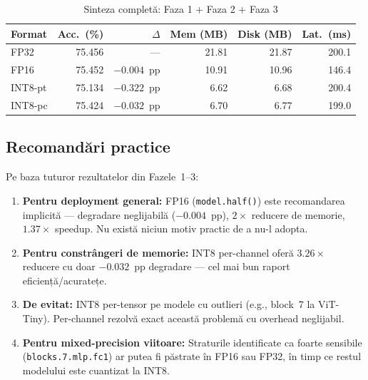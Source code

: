 \documentclass[12pt,a4paper]{article}
\begin{document}
\begin{table}[H]
  \centering
  \caption{Sinteza completă: Faza 1 + Faza 2 + Faza 3}
  \begin{tabular}{lrrrrr}
    \toprule
    \textbf{Format} & \textbf{Acc.\ (\%)} & \textbf{$\Delta$} &
    \textbf{Mem (MB)} & \textbf{Disk (MB)} & \textbf{Lat.\ (ms)} \\
    \midrule
    FP32       & 75.456 & ---           & 21.81 & 21.87 & 200.1 \\
    FP16       & 75.452 & $-0.004$~pp   & 10.91 & 10.96 & 146.4 \\
    INT8-pt    & 75.134 & $-0.322$~pp   & \phantom{0}6.62 & \phantom{0}6.68 & 200.4 \\
    INT8-pc    & 75.424 & $-0.032$~pp   & \phantom{0}6.70 & \phantom{0}6.77 & 199.0 \\
    \bottomrule
  \end{tabular}
  \label{tab:full_synthesis}
\end{table}

\subsection{Recomandări practice}

Pe baza tuturor rezultatelor din Fazele~1--3:

\begin{enumerate}
  \item \textbf{Pentru deployment general:} FP16 (\texttt{model.half()}) este
    recomandarea implicită --- degradare neglijabilă ($-0.004$~pp),
    $2\times$ reducere de memorie, $1.37\times$ speedup.
    Nu există niciun motiv practic de a nu-l adopta.

  \item \textbf{Pentru constrângeri de memorie:} INT8 per-channel oferă
    $3.26\times$ reducere cu doar $-0.032$~pp degradare --- cel mai bun
    raport eficiență/acuratețe.

  \item \textbf{De evitat:} INT8 per-tensor pe modele cu outlieri
    (e.g., block~7 la ViT-Tiny). Per-channel rezolvă exact această
    problemă cu overhead neglijabil.

  \item \textbf{Pentru mixed-precision viitoare:} Straturile identificate
    ca foarte sensibile (\texttt{blocks.7.mlp.fc1}) ar putea fi păstrate
    în FP16 sau FP32, în timp ce restul modelului este cuantizat la INT8.
\end{enumerate}
\end{document}
